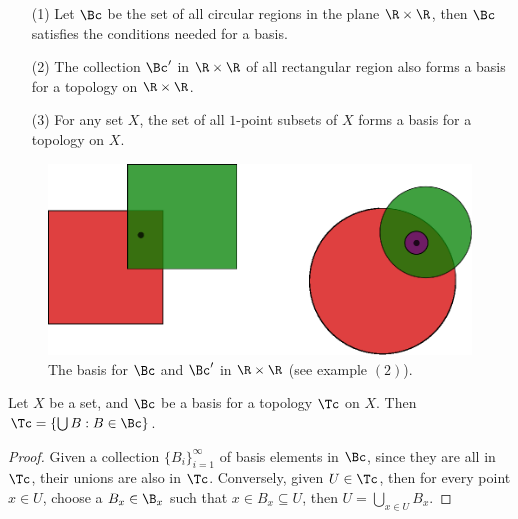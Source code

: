 \begin{example}
    \begin{enumerate}
        \item[(1)] Let $\Bc$ be the set of all circular regions in the plane  $\R \times \R$, then
            $\Bc$ satisfies the conditions needed for a basis.

        \item[(2)] The collection  $\Bc'$ in  $\R \times \R$ of all rectangular region also
            forms a basis for a topology on  $\R \times \R$.

        \item[(3)] For any set  $X$, the set of all  $1$-point subsets of  $X$ forms a
            basis for a topology on  $X$.
    \end{enumerate}
\end{example}

\begin{figure}[h]
    \centering
    \includegraphics[scale = 0.5]{Figures/Chapter1/topology_basis.eps}
    \caption{The basis for $\Bc$ and  $\Bc'$ in  $\R \times \R$  (see example $(2)$).}
    \label{fig_1.2}
\end{figure}

\begin{lemma}\label{1.2.2}
    Let $X$ be a set, and  $\Bc$ be a basis for a topology  $\Tc$ on  $X$. Then
    $\Tc=\{\bigcup{B}: B \in \Bc\}$.
\end{lemma}
\begin{proof}
    Given a collection $\{B_i\}_{i=1}^{\infty}$ of basis elements in  $\Bc$, since they
    are all in  $\Tc$, their unions are also in $\Tc$. Conversely, given  $U \in \Tc$,
    then for every point $x \in U$, choose a  $B_x \in \B_x$ such that  $x \in B_x
    \subseteq U$, then  $U=\bigcup_{x \in U}{B_x}$.
\end{proof}

